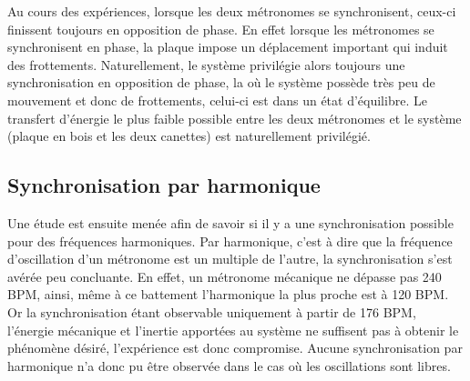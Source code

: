 \documentclass[a4paper,11pt]{report}
\begin{document}
Au cours des expériences, lorsque les deux métronomes se synchronisent, ceux-ci finissent toujours en opposition de phase. En effet lorsque les métronomes se synchronisent en phase, la plaque impose un déplacement important qui induit des frottements. Naturellement, le système privilégie alors toujours une synchronisation en opposition de phase, la où le système possède très peu de mouvement et donc de frottements, celui-ci est dans un état d'équilibre. Le transfert d'énergie le plus faible possible entre les deux métronomes et le système (plaque en bois et les deux canettes) est naturellement privilégié.	

\subsection{Synchronisation par harmonique}
Une étude est ensuite menée afin de savoir si il y a une synchronisation possible pour des fréquences harmoniques. Par harmonique, c'est à dire que la fréquence d'oscillation d'un métronome est un multiple de l'autre, la synchronisation s'est avérée peu concluante. En effet, un métronome mécanique ne dépasse pas 240 BPM, ainsi, même à ce battement l'harmonique la plus proche est à 120 BPM. Or la synchronisation étant observable uniquement à partir de 176 BPM, l'énergie mécanique et l'inertie apportées au système ne suffisent pas à obtenir le phénomène désiré, l'expérience est donc compromise. Aucune synchronisation par harmonique n'a donc pu être observée dans le cas où les oscillations sont libres.
\end{document}
